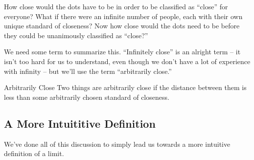 How close would the dots have to be in order to be classified as ``close'' for everyone? What if there were an infinite number of people, each with their own unique standard of closeness? Now how close would the dots need to be before they could be unanimously classified as ``close?''

We need some term to summarize this. ``Infinitely close'' is an alright term -- it isn't too hard for us to understand, even though we don't have a lot of experience with infinity -- but we'll use the term ``arbitrarily close.''

\begin{defn}{Arbitrarily Close}
  Two things are arbitrarily close if the distance between them is less than some arbitrarily chosen standard of closeness.
\end{defn}

\subsection*{A More Intuititive Definition}

We've done all of this discussion to simply lead us towards a more intuitive definition of a limit.
